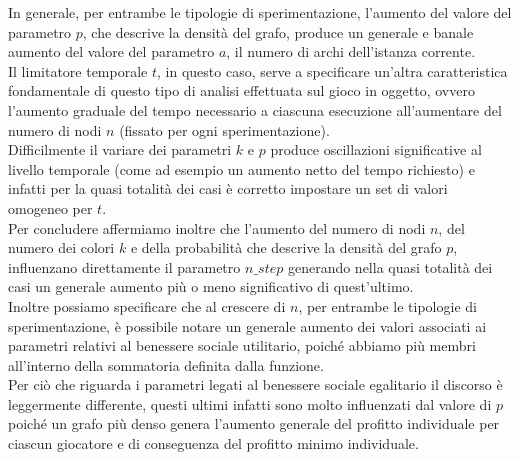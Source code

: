 In generale, per entrambe le tipologie di sperimentazione, l'aumento del valore del parametro $p$, che descrive la densità del grafo, produce un generale e banale aumento del valore del parametro $a$, il numero di archi dell'istanza corrente.\\

Il limitatore temporale $t$, in questo caso, serve a specificare un'altra caratteristica fondamentale di questo tipo di analisi effettuata sul gioco in oggetto, ovvero l'aumento graduale del tempo necessario a ciascuna esecuzione all'aumentare del numero di nodi $n$ (fissato per ogni sperimentazione).\\
Difficilmente il variare dei parametri $k$ e $p$ produce oscillazioni significative al livello temporale (come ad esempio un aumento netto del tempo richiesto) e infatti per la quasi totalità dei casi è corretto impostare un set di valori omogeneo per $t$.\\

Per concludere affermiamo inoltre che l'aumento del numero di nodi $n$, del numero dei colori $k$ e della probabilità che descrive la densità del grafo $p$, influenzano direttamente il parametro $n\_step$ generando nella quasi totalità dei casi un generale aumento più o meno significativo di quest'ultimo.\\
Inoltre possiamo specificare che al crescere di $n$, per entrambe le tipologie di sperimentazione, è possibile notare un generale aumento dei valori associati ai parametri relativi al benessere sociale utilitario, poiché abbiamo più membri all'interno della sommatoria definita dalla funzione.\\
Per ciò che riguarda i parametri legati al benessere sociale egalitario il discorso è leggermente differente, questi ultimi infatti sono molto influenzati dal valore di $p$ poiché un grafo più denso genera l'aumento generale del profitto individuale per ciascun giocatore e di conseguenza del profitto minimo individuale.\\ 
